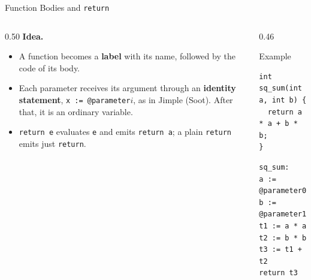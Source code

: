\documentclass[aspectratio=169,11pt,xcolor=table]{beamer}
\newcommand{\tc}[1]{\texttt{#1}}
\begin{document}
\begin{frame}[fragile]{Function Bodies and \tc{return}}
  \begin{columns}[T]
    \begin{column}{0.50\textwidth}
      \textbf{Idea.}
      \begin{itemize}
        \item A function becomes a \textbf{label} with its name,
              followed by the code of its body.
        \item Each parameter receives its argument through an
              \textbf{identity statement}, \tc{x := @parameter$i$},
              as in Jimple (Soot). After that, it is an ordinary variable.
        \item \tc{return e} evaluates \tc{e} and emits \tc{return a};
              a plain \tc{return} emits just \tc{return}.
      \end{itemize}
    \end{column}
    \begin{column}{0.46\textwidth}
      \begin{block}{Example}
        \begin{verbatim}
int sq_sum(int a, int b) {
  return a * a + b * b;
}
        \end{verbatim}
        \vspace{0.3em}
        \begin{verbatim}
sq_sum:
a := @parameter0
b := @parameter1
t1 := a * a
t2 := b * b
t3 := t1 + t2
return t3
        \end{verbatim}
      \end{block}
    \end{column}
  \end{columns}
\end{frame}
\end{document}
